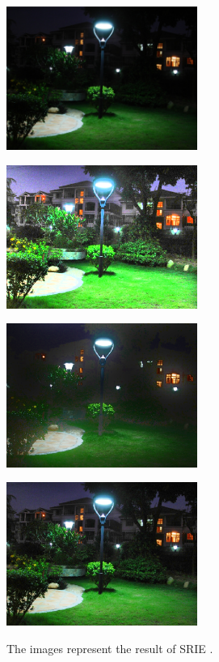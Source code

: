 \begin{figure}[htbp]
	\begin{minipage}[b]{0.5\hsize}
		\centering
		\includegraphics[width=62.5mm]{images/variational/input.eps}
		 \label{fig:variational/input}
	\end{minipage}
	\begin{minipage}[b]{0.5\hsize}
		\centering
		\includegraphics[width=62.5mm]{images/variational/reflectance.eps}
		 \label{fig:variational/reflectance}
	\end{minipage}
	\begin{minipage}[b]{0.5\hsize}
		\centering
		\includegraphics[width=62.5mm]{images/variational/illumination.eps}
		 \label{fig:variational/illumination}
	\end{minipage}
	\begin{minipage}[b]{0.5\hsize}
		\centering
		\includegraphics[width=62.5mm]{images/variational/output.eps}
		 \label{fig:variational/output}
	\end{minipage}
	\caption{The images represent the result of SRIE \cite{srie}.}
	\label{fig:variational/srie}
\end{figure}

